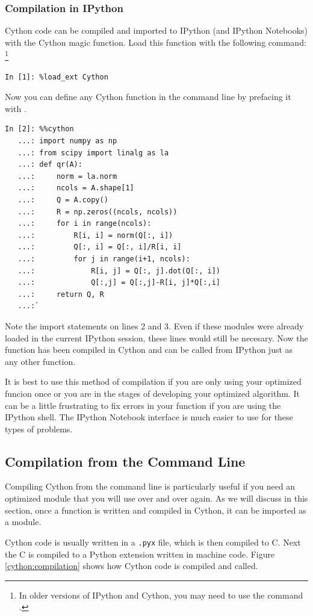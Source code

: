 \subsubsection*{Compilation in IPython}
Cython code can be compiled and imported to IPython (and IPython Notebooks) with the Cython magic function.
Load this function with the following command:
\footnote{In older versions of IPython and Cython, you may need to use the command .}
\begin{lstlisting}
In [1]: %load_ext Cython
\end{lstlisting}
Now you can define any Cython function in the command line by prefacing it with .
\begin{lstlisting}
In [2]: %%cython
   ...: import numpy as np
   ...: from scipy import linalg as la
   ...: def qr(A):
   ...:     norm = la.norm
   ...:     ncols = A.shape[1]
   ...:     Q = A.copy()
   ...:     R = np.zeros((ncols, ncols))
   ...:     for i in range(ncols):
   ...:         R[i, i] = norm(Q[:, i])
   ...:         Q[:, i] = Q[:, i]/R[i, i]
   ...:         for j in range(i+1, ncols):
   ...:             R[i, j] = Q[:, j].dot(Q[:, i])
   ...:             Q[:,j] = Q[:,j]-R[i, j]*Q[:,i]
   ...:     return Q, R
   ...:`
\end{lstlisting}
Note the import statements on lines 2 and 3. Even if these modules were already loaded in the current IPython session, these lines would still be necesary. Now the  function has been compiled in Cython and can be called from IPython just as any other function. 

It is best to use this method of compilation if you are only using your optimized funcion once or you are in the stages of developing your optimized algorithm. It can be a little frustrating to fix errors in your function if you are using the IPython shell. The IPython Notebook interface is much easier to use for these types of problems.

\subsection*{Compilation from the Command Line}
Compiling Cython from the command line is particularly useful if you need an optimized module that you will use over and over again. As we will discuss in this section, once a function is written and compiled in Cython, it can be imported as a module.

Cython code is usually written in a \texttt{.pyx} file, which is then compiled to C.
Next the C is compiled to a Python extension written in machine code.
Figure \ref{cython:compilation} shows how Cython code is compiled and called.


